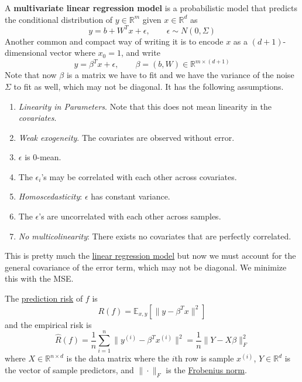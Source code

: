   \begin{definition}
    \label{def:multivariate-linear-regression}
 
    A \textbf{multivariate linear regression model} is a probabilistic model that predicts the conditional distribution of $y \in \mathbb{R}^{m}$ given $x \in \mathbb{R}^d$ as 
    \begin{equation}
      y = b + W^T x + \epsilon, \qquad \epsilon \sim N(0, \Sigma)
    \end{equation}
    Another common and compact way of writing it is to encode $x$ as a $(d+1)$-dimensional vector where $x_0 = 1$, and write 
    \begin{equation}
      y = \beta^T x + \epsilon, \qquad \beta = (b, W) \in \mathbb{R}^{m \times (d+1)}
    \end{equation}
    Note that now $\beta$ is a matrix we have to fit and we have the variance of the noise $\Sigma$ to fit as well, which may not be diagonal. It has the following assumptions.
    \begin{enumerate}
      \item \textit{Linearity in Parameters}. Note that this does not mean linearity in the \textit{covariates}.
      \item \textit{Weak exogeneity}. The covariates are observed without error. 
      \item $\epsilon$ is $0$-mean. 
      \item The $\epsilon_i$'s may be correlated with each other across covariates. 
      \item \textit{Homoscedasticity}: $\epsilon$ has constant variance. 
      \item The $\epsilon$'s are uncorrelated with each other across samples. 
      \item \textit{No multicolinearity}: There exists no covariates that are perfectly correlated. 
    \end{enumerate}
  \end{definition} 

  This is pretty much the \hyperref[def:linear-regression-model]{linear regression model} but now we must account for the general covariance of the error term, which may not be diagonal. We minimize this with the MSE. 

  \begin{lemma}[Risk]
    \label{thm:risk}
    The \hyperref[thm:prediction-risk]{prediction risk} of $f$ is 
    \begin{equation}
      R(f) = \mathbb{E}_{x, y} \left[ \| y - \beta^T x \|^2 \right]
    \end{equation}
    and the empirical risk is 
    \begin{equation}
      \hat{R}(f) = \frac{1}{n} \sum_{i=1}^n \| y^{(i)} - \beta^T x^{(i)} \|^2 = \frac{1}{n} \|Y - X \beta\|_F^2
    \end{equation}
    where $X \in \mathbb{R}^{n \times d}$ is the data matrix where the $i$th row is sample $x^{(i)}$, $Y \in \mathbb{R}^d$ is the vector of sample predictors, and $\| \cdot \|_F$ is the \hyperref[lin-def:frobenius-norm-2]{Frobenius norm}. 
  \end{lemma}

